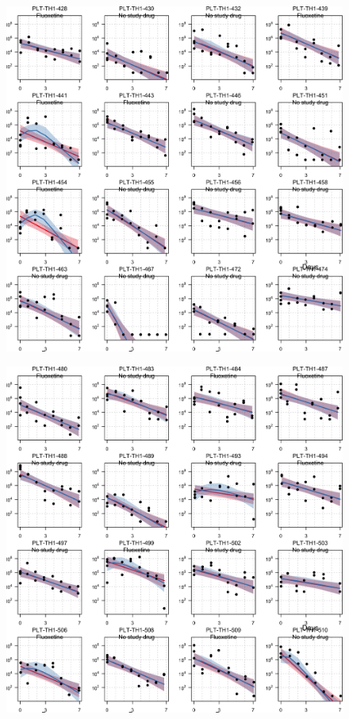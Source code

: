 \documentclass[
  letterpaper,
  DIV=11,
  numbers=noendperiod]{scrartcl}
\begin{document}
\begin{figure}[H]

{\centering \includegraphics{Fluoxetine_analysis_files/figure-pdf/individ_data-9.png}

}

\end{figure}

\begin{figure}[H]

{\centering \includegraphics{Fluoxetine_analysis_files/figure-pdf/individ_data-10.png}

}

\end{figure}
\end{document}
